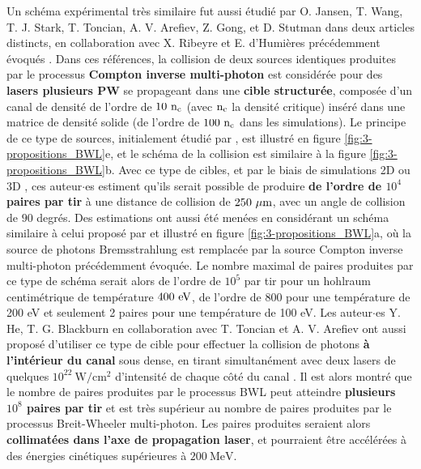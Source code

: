 \begin{refsection}
Un schéma expérimental très similaire fut aussi étudié par O. Jansen, T. Wang, T. J. Stark, T. Toncian, A. V. Arefiev,  Z. Gong, et D. Stutman dans deux articles distincts, en collaboration avec X. Ribeyre et E. d'Humières précédemment évoqués \parencite{jansen_2018a, wang_2020}. Dans ces références, la collision de deux sources identiques produites par le processus \textbf{Compton inverse multi-photon} est considérée pour des \textbf{lasers plusieurs PW} se propageant dans une \textbf{cible structurée}, composée d'un canal de densité de l'ordre de $10 ~ \rm n_c$ (avec $\rm n_c$ la densité critique) inséré dans une matrice de densité solide (de l'ordre de $100 ~ \rm n_c$ dans les simulations). Le principe de ce type de sources, initialement étudié par \cite{stark_2016}, est illustré en figure \ref{fig:3-propositions_BWL}e, et le schéma de la collision est similaire à la figure \ref{fig:3-propositions_BWL}b. Avec ce type de cibles, et par le biais de simulations 2D \parencite{jansen_2018a} ou 3D \parencite{wang_2020}, ces auteur$\cdot$es estiment qu'ils serait possible de produire \textbf{de l'ordre de $10^4$ paires par tir} à une distance de collision de $250 ~ \rm \mu m$, avec un angle de collision de $90$ degrés. Des estimations ont aussi été menées en considérant un schéma similaire à celui proposé par \cite{pike_2014} et illustré en figure \ref{fig:3-propositions_BWL}a, où la source de photons Bremsstrahlung est remplacée par la source Compton inverse multi-photon précédemment évoquée. Le nombre maximal de paires produites par ce type de schéma serait alors de l'ordre de $10^{5}$ par tir pour un hohlraum centimétrique de température $400 ~ \rm eV$, de l'ordre de $800$ pour une température de 200 eV et seulement 2 paires pour une température de 100 eV. Les auteur$\cdot$es Y. He, T. G. Blackburn en collaboration avec T. Toncian et A. V. Arefiev ont aussi proposé d'utiliser ce type de cible pour effectuer la collision de photons \textbf{à l'intérieur du canal} sous dense, en tirant simultanément avec deux lasers de quelques $10^{22} ~ \si{\W\per\cm^2}$ d'intensité de chaque côté du canal \parencite{he_2020}. Il est alors montré que le nombre de paires produites par le processus BWL peut atteindre \textbf{plusieurs $10^8$ paires par tir} et est très supérieur au nombre de paires produites par le processus Breit-Wheeler multi-photon. Les paires produites seraient alors\textbf{ collimatées dans l'axe de propagation laser}, et pourraient être accélérées à des énergies cinétiques supérieures à $200 ~ \si{\MeV}$. 


\end{refsection}
